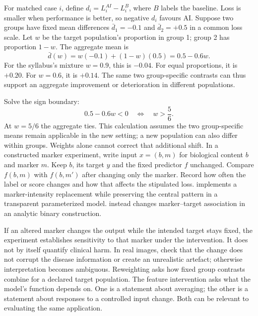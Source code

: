 For matched case $i$, define $d_i=L_i^{AI}-L_i^B$, where $B$ labels the baseline. Loss is smaller when performance is better, so negative $d_i$ favours AI. Suppose two groups have fixed mean differences $\bar d_1=-0.1$ and $\bar d_2=+0.5$ in a common loss scale.
Let $w$ be the target population's proportion in group 1; group 2 has proportion $1-w$. The aggregate mean is
\[
\bar d(w)=w(-0.1)+(1-w)(0.5)=0.5-0.6w.
\]
For the syllabus's mixture $w=0.9$, this is $-0.04$. For equal proportions, it is $+0.20$. For $w=0.6$, it is $+0.14$. The same two group-specific contrasts can thus support an aggregate improvement or deterioration in different populations.

Solve the sign boundary:
\[
0.5-0.6w<0\quad\Longleftrightarrow\quad w>\frac56.
\]
At $w=5/6$ the aggregate ties. This calculation assumes the two group-specific means remain applicable in the new setting; a new population can also differ within groups. Weights alone cannot correct that additional shift.
In a constructed marker experiment, write input $x=(b,m)$ for biological content $b$ and marker $m$. Keep $b$, its target $y$ and the fixed predictor $f$ unchanged. Compare $f(b,m)$ with $f(b,m')$ after changing only the marker. Record how often the label or score changes and how that affects the stipulated loss.  implements a marker-intensity replacement while preserving the central pattern in a transparent parameterized model.  instead changes marker--target association in an analytic binary construction.

If an altered marker changes the output while the intended target stays fixed, the experiment establishes sensitivity to that marker under the intervention. It does not by itself quantify clinical harm. In real images, check that the change does not corrupt the disease information or create an unrealistic artefact; otherwise interpretation becomes ambiguous.
Reweighting asks how fixed group contrasts combine for a declared target population. The feature intervention asks what the model's function depends on. One is a statement about averaging; the other is a statement about responses to a controlled input change. Both can be relevant to evaluating the same application.

